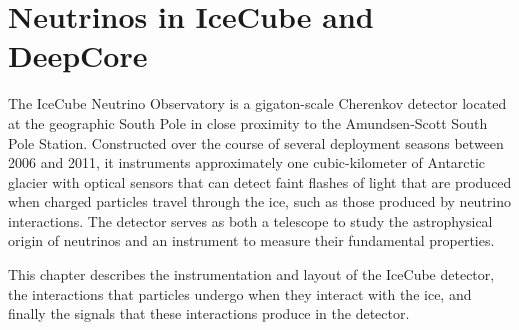 \setchapterpreamble[u]{\margintoc}
\chapter{Neutrinos in IceCube and DeepCore}

The IceCube Neutrino Observatory is a gigaton-scale Cherenkov detector located at the geographic South Pole in close proximity to the Amundsen-Scott South Pole Station.
Constructed over the course of several deployment seasons between 2006 and 2011, it instruments approximately one cubic-kilometer of Antarctic glacier with optical sensors that can detect faint flashes of light that are produced when charged particles travel through the ice, such as those produced by neutrino interactions.
The detector serves as both a telescope to study the astrophysical origin of neutrinos and an instrument to measure their fundamental properties.

This chapter describes the instrumentation and layout of the IceCube detector, the interactions that particles undergo when they interact with the ice, and finally the signals that these interactions produce in the detector.







% 
% 
